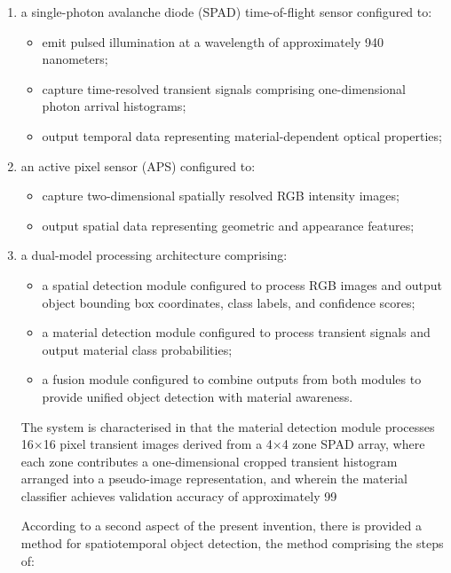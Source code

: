 \documentclass[11pt,a4paper]{article}
\begin{document}
\begin{enumerate}[leftmargin=*,label=\alph*)]
\item a single-photon avalanche diode (SPAD) time-of-flight sensor configured to:
\begin{itemize}[leftmargin=*]
\item emit pulsed illumination at a wavelength of approximately 940 nanometers;
\item capture time-resolved transient signals comprising one-dimensional photon arrival histograms;
\item output temporal data representing material-dependent optical properties;
\end{itemize}

\item an active pixel sensor (APS) configured to:
\begin{itemize}[leftmargin=*]
\item capture two-dimensional spatially resolved RGB intensity images;
\item output spatial data representing geometric and appearance features;
\end{itemize}

\item a dual-model processing architecture comprising:
\begin{itemize}[leftmargin=*]
\item a spatial detection module configured to process RGB images and output object bounding box coordinates, class labels, and confidence scores;
\item a material detection module configured to process transient signals and output material class probabilities;
\item a fusion module configured to combine outputs from both modules to provide unified object detection with material awareness.
\end{itemize}

The system is characterised in that the material detection module processes 16$\times$16 pixel transient images derived from a 4$\times$4 zone SPAD array, where each zone contributes a one-dimensional cropped transient histogram arranged into a pseudo-image representation, and wherein the material classifier achieves validation accuracy of approximately 99%

According to a second aspect of the present invention, there is provided a method for spatiotemporal object detection, the method comprising the steps of:


\end{enumerate}
\end{document}
